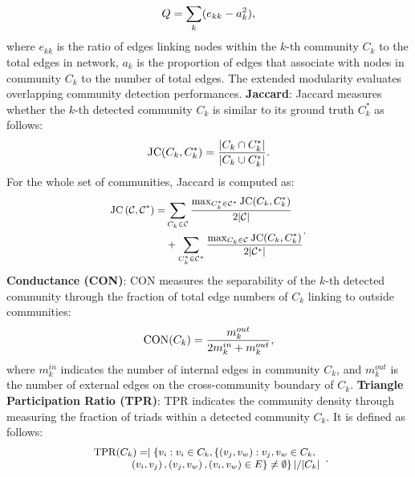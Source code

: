 \begin{equation}
\small
Q = \sum_{k} (e_{kk} - a_{k}^{2}), 
\label{eq-modularity}
\end{equation}
where $e_{kk}$ is the ratio of edges linking nodes within the $k$-th community $C_{k}$ to the total edges in network, $a_{k}$ is the proportion of edges that associate with nodes in community $C_{k}$ to the number of total edges. The extended modularity  evaluates overlapping community detection performances.  
\vspace{2mm}
\noindent
\textbf{Jaccard}: Jaccard measures whether the $k$-th detected community $C_{k}$ is similar to its ground truth $C_{k}^{*}$ as follows: 
\begin{equation}
\small
\operatorname{JC}(C_{k}, C_{k}^{*})=\frac{|C_{k}\cap C_{k}^{*}|}{|C_{k} \cup C_{k}^{*}|}. 
\end{equation}
For the whole set of communities, Jaccard is computed as: 
\begin{equation}
\small
\begin{aligned}
\operatorname{JC}\left(\mathcal{C}, \mathcal{C}^*\right)= &\sum_{C_{k}\in \mathcal{C}}\frac{\max_{C_{k}^{*}\in \mathcal{C}^{*}}\operatorname{JC}(C_{k}, C_{k}^{*})}{2|\mathcal{C}|}\\
&+\sum_{C_{k}^{*}\in \mathcal{C}^{*}} \frac{\max_{C_{k}\in \mathcal{C}}\operatorname{JC}(C_{k}, C_{k}^{*})}{2|\mathcal{C^*}|}
\end{aligned}. 
\end{equation}
\vspace{2mm}
\noindent
\textbf{Conductance (CON)}: CON measures the separability of the $k$-th detected community through the fraction of total edge numbers of $C_{k}$ linking to outside communities:
\begin{equation}
\small
\operatorname{CON}(C_{k})=\frac{m_{k}^{out}}{2 m_{k}^{in} + m_{k}^{out}},
\end{equation}
where $m_{k}^{in}$ indicates the number of internal edges in community $C_{k}$, and $m_{k}^{out}$ is the number of external edges on the cross-community boundary of $C_{k}$.
\vspace{2mm}
\noindent
\textbf{Triangle Participation Ratio (TPR)}: TPR indicates the community density through measuring the fraction of triads within a detected community $C_{k}$. It is defined as follows:
\begin{equation}
\small
\begin{array}{r}
\operatorname{TPR}(C_{k})=\mid\left\{v_{i}:v_{i}\in C_{k},\left\{\left(v_{j}, v_{w}\right):v_{j}, v_{w} \in C_{k},  \right.\right. \\
\left.\left.\left(v_{i}, v_{j}\right),\left(v_{j}, v_{w}\right),\left(v_{i}, v_{w}\right) \in E\right\} \neq \emptyset\right\}| / |C_{k}|
\end{array}.
\end{equation}

